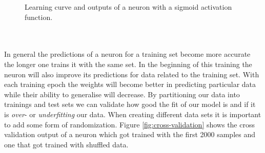 \documentclass[12pt, a4paper]{article}
\newcounter{task}
\begin{document}
\begin{figure}[htbp]
	\caption{Learning curve and outputs of a neuron with a sigmoid activation function.}
	\label{fig:neuron}
\end{figure}\\\\
In general the predictions of a neuron for a training set become more accurate the longer one trains it with the same set. In the beginning of this training the neuron will also improve its predictions for data related to the training set. With each training epoch the weights will become better in predicting particular data while their ability to generalise will decrease. By partitioning our data into trainings and test sets we can validate how good the fit of our model is and if it is \textit{over}- or \textit{underfitting} our data. When creating different data sets it is important to add some form of randomization. Figure \ref{fig:cross-validation} shows the cross validation output of a neuron which got trained with the first 2000 samples and one that got trained with shuffled data.
\end{document}

